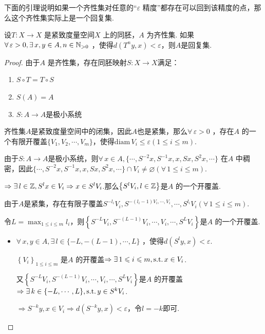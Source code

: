 下面的引理说明如果一个齐性集对任意的“$\varepsilon$ 精度”都存在可以回到该精度的点，那么这个齐性集实际上是一个回复集.\par
\begin{lemma}
    设$T:X\to X$ 是紧致度量空间$X$ 上的同胚，$A$ 为齐性集. 如果$\forall\, \varepsilon>0,\exists\, x,y\in A,n\in\mathbb{N}_{>0}$ ，使得$d \left(T^ny,x\right)<\varepsilon$，则$A$是回复集.
\end{lemma}
\begin{proof}
    由于$A$ 是齐性集，存在同胚映射$S:X\to X$满足： \par
    \begin{enumerate}[(1)]
        \item $S\circ T=T\circ S$
        \item $S(A)=A$
        \item $S:A\to A$是极小系统
    \end{enumerate}\par
    齐性集$A$是紧致度量空间中的闭集，因此$A$也是紧集，那么$\forall\,\varepsilon>0$ ，存在$A$ 的一个有限开覆盖$\{V_1,V_2,\cdots,V_m\}$，使得$\mathrm{diam}\, V_i\leq\varepsilon(1\leq i\leq m)$.\par
    由于$S:A\to A$是极小系统，则$\forall\, x\in A,\{\cdots,S^{-2}x,S^{-1}x,x,Sx,S^2x,\cdots\}$ 在$A$ 中稠密，因此$\{\cdots,S^{-2}x,S^{-1}x,x,Sx,S^2x,\cdots\}\cap V_i\neq\varnothing(\forall\, 1\leq i\leq m)$.\par
    $\Rightarrow \exists\, l\in\mathbb{Z},S^lx\in V_i\Rightarrow x\in S^lV_i$.那么$\left\{S^lV_i,l\in\mathbb{Z}\right\}$是$A$ 的一个开覆盖.\par
    由于$A$是紧集，存在有限子覆盖$S^{-l_i}V_i,S^{-(l_i-1)V_i,\cdots,V_i},\cdots,S^{l_i}V_i(\forall\, 1\leq i\leq m)$.\par
    令$L=\max_{1\leq i\leq m}{l_i}$，则$\left\{S^{-L}V_i,S^{-(L-1)}V_i,\cdots,V_i,\cdots,S^{L}V_i\right\}$是$A$ 的一个开覆盖.\par
    \begin{itemize}
        \item $\forall\, x,y\in A,\exists\, l\in\{-L,-(L-1),\cdots,L\}$ ，使得$d\left(S^ly,x\right)<\varepsilon$.\par
        $\left\{V_i\right\}_{1\leq i\leq m}$ 是$A$ 的开覆盖$\Rightarrow \exists\, 1\leqslant i\leqslant m,\operatorname{\text{s.t.}} x\in V_i$.\par
        又$\left\{S^{-L}V_i,S^{-(L-1)}V_i,\cdots,V_i,\cdots,S^{L}V_i\right\}$是$A$ 的开覆盖$\Rightarrow \exists\, k\in\{-L,\cdots,L\},\operatorname{\text{s.t.}} y\in S^{k}V_i$.\par
        $\Rightarrow S^{-k}y,x\in V_i\Rightarrow d \left(S^{-k}y,x\right)<\varepsilon$，令$l=-k$即可.

\end{itemize}
\end{proof}

